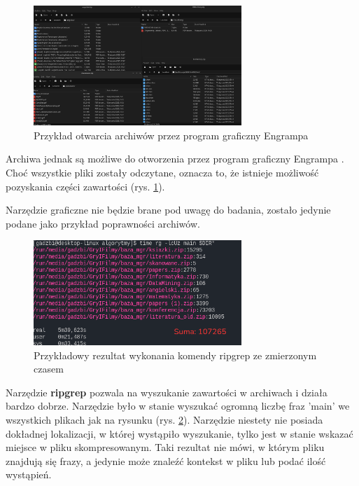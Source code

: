 \begin{figure}[h]
\centering
\includegraphics[width=0.7\textwidth]{./images/przykład-otwarcia-archiwów.png}
\caption{Przykład otwarcia archiwów przez program graficzny Engrampa}
\label{fig:engrampaExample}
\end{figure}

Archiwa jednak są możliwe do otworzenia przez program graficzny Engrampa \cite{bib:internet:EngrampaArchives}.
Choć wszystkie pliki zostały odczytane, oznacza to, że istnieje możliwość pozyskania
części zawartości (rys. \ref{fig:engrampaExample}).

Narzędzie graficzne nie będzie brane pod uwagę do badania, zostało jedynie podane
jako przykład poprawności archiwów.

\begin{figure}[h]
\centering
\includegraphics[width=0.7\textwidth]{./images/ripgrep-result-main.png}
\caption{Przykładowy rezultat wykonania komendy ripgrep ze zmierzonym czasem}
\label{fig:ripgrepResultMain}
\end{figure}

Narzędzie \textbf{ripgrep} pozwala na wyszukanie zawartości w archiwach i działa bardzo dobrze.
Narzędzie było w stanie wyszukać ogromną liczbę fraz 'main' we wszystkich plikach 
jak na rysunku (rys. \ref{fig:ripgrepResultMain}).
Narzędzie niestety nie posiada dokładnej lokalizacji, w której wystąpiło wyszukanie,
tylko jest w stanie wskazać miejsce w pliku skompresowanym.
Taki rezultat nie mówi, w którym pliku znajdują się frazy, a jedynie może znaleźć 
kontekst w pliku lub podać ilość wystąpień.

